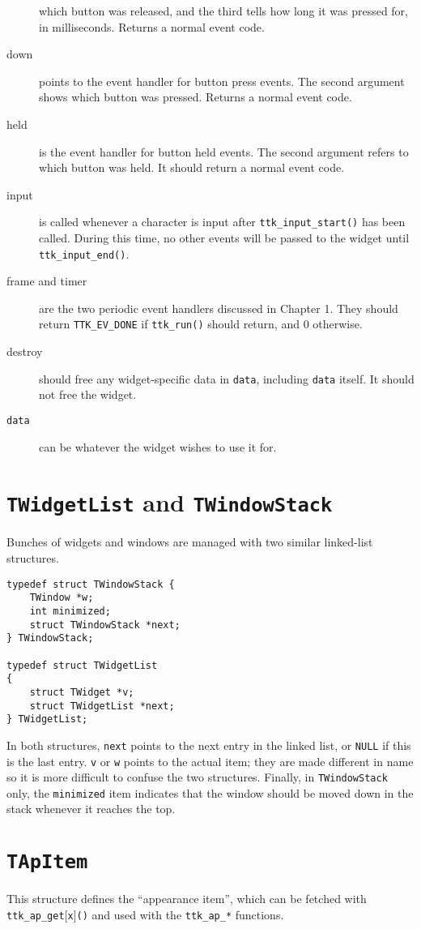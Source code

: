 \documentclass[12pt,letterpaper]{report}
\let\ttt\tt
\def\tt{\def\_{{\ttt\char`\_}}\ttt}
\def\texttt#1{{\tt #1}}
\begin{document}
\begin{description}
which button was released, and the third tells how long it was pressed for, in milliseconds.
Returns a normal event code.
\item[{\sf down}] points to the event handler for button press events. The second argument shows which
button was pressed. Returns a normal event code.
\item[{\sf held}] is the event handler for button held events. The second argument refers to which button
was held. It should return a normal event code.
\item[{\sf input}] is called whenever a character is input after \verb|ttk_input_start()| has been called.
During this time, no other events will be passed to the widget until \verb|ttk_input_end()|.
\item[{\sf frame} and {\sf timer}] are the two periodic event handlers discussed in Chapter 1. They
should return \verb|TTK_EV_DONE| if \verb|ttk_run()| should return, and 0 otherwise.
\item[{\sf destroy}] should free any widget-specific data in {\tt data}, including {\tt data} itself.
It should not free the widget.
\item[{\tt data}] can be whatever the widget wishes to use it for.
\end{description}

\section{\texttt{TWidgetList} and \texttt{TWindowStack}}
Bunches of widgets and windows are managed with two similar linked-list structures.
\begin{verbatim}
typedef struct TWindowStack {
    TWindow *w;
    int minimized;
    struct TWindowStack *next;
} TWindowStack;

typedef struct TWidgetList 
{
    struct TWidget *v;
    struct TWidgetList *next;
} TWidgetList;
\end{verbatim}

In both structures, \verb|next| points to the next entry in the linked list, or \verb|NULL| if this is
the last entry. \texttt{v} or \texttt{w} points to the actual item; they are made different in name
so it is more difficult to confuse the two structures. Finally, in \verb|TWindowStack| only,
the \verb|minimized| item indicates that the window should be moved down in the stack whenever it
reaches the top.

\section{\texttt{TApItem}}
This structure defines the ``appearance item'', which can be fetched with \verb|ttk_ap_get|[\verb|x|]\verb|()|
and used with the \verb|ttk_ap_*| functions.
\end{document}

